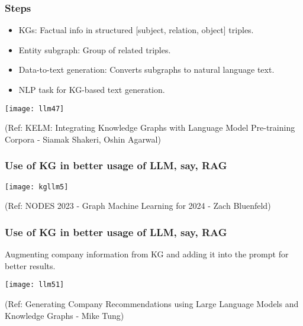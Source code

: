 \begin{frame}[fragile]\frametitle{Steps}

\begin{itemize}
\item  KGs: Factual info in structured [subject, relation, object] triples.
\item  Entity subgraph: Group of related triples.
\item  Data-to-text generation: Converts subgraphs to natural language text.
\item  NLP task for KG-based text generation.
\end{itemize}

\begin{center}
\texttt{[image: llm47]}
\end{center}	

{\tiny (Ref: KELM: Integrating Knowledge Graphs with Language Model Pre-training Corpora - Siamak Shakeri, Oshin Agarwal)}
\end{frame}

\begin{frame}[fragile]\frametitle{Use of KG in better usage of LLM, say, RAG}

\begin{center}
\texttt{[image: kgllm5]}
\end{center}	

{\tiny (Ref: NODES 2023 - Graph Machine Learning for 2024 - Zach Bluenfeld)}

\end{frame}


\begin{frame}[fragile]\frametitle{Use of KG in better usage of LLM, say, RAG}

Augmenting company information from KG and adding it into the prompt for better results.

\begin{center}
\texttt{[image: llm51]}
\end{center}	

{\tiny (Ref: Generating Company Recommendations using Large Language Models and Knowledge Graphs - Mike Tung)}

\end{frame}

